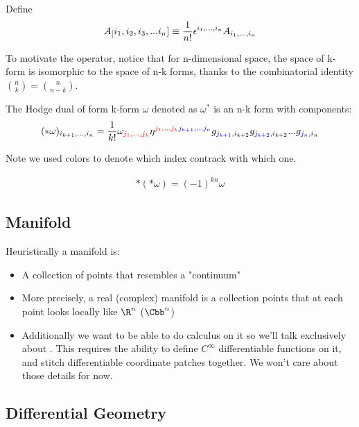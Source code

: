 \documentclass[11pt]{scrartcl}
\begin{document}
\begin{definition}
	Define \begin{align}
		A_[i_1, i_2, i_3, ... i_n] \equiv {1 \over n!} \epsilon^{i_{1}, ..., i_n} A_{i_1, ..., i_n}
	\end{align}
\end{definition}


To motivate the  operator, notice that for n-dimensional space, the space of k-form is isomorphic to the space of n-k forms, thanks to the combinatorial identity ${n \choose k } = {n \choose n-k}$.
\begin{definition}
	The Hodge dual of form k-form $\omega$ denoted as $\omega^*$ is an n-k form with components:
	\begin{align}
		(*\omega)_{i_{k+1}, ..., i_{n}} = {1 \over k!} \omega_{\color{red} j_1, ..., j_k} \eta^{{\color{red}j_1, .., j_{k}} {\color{blue} j_{k+1},... j_n}} g_{{\color{blue} j_{k+1}}, i_{k+2}} g_{{\color{blue} j_{k+2}}, i_{k+2}}...g_{{\color{blue} j_{n}}, i_n}
	\end{align}
\end{definition}
Note we used colors to denote which index contrack with which one.

\begin{lemma}
	\begin{align}
		*(*\omega) =(-1)^{kn} \omega
	\end{align}
\end{lemma}
\subsection{Manifold}

Heuristically a manifold is:
\begin{itemize}
	\item A collection of points that resembles a "continuum"
	\item More precisely, a real (complex) manifold is a collection points that at each point looks locally like $\R^n$ ($\Cbb^n$)
	\item Additionally we want to be able to do calculus on it so we'll talk exclusively about .  This requires the ability to define $C^\infty$ differentiable functions on it, and stitch differentiable coordinate patches together.  We won't care about those details for now.
\end{itemize}

\subsection{Differential Geometry}
\end{document}
